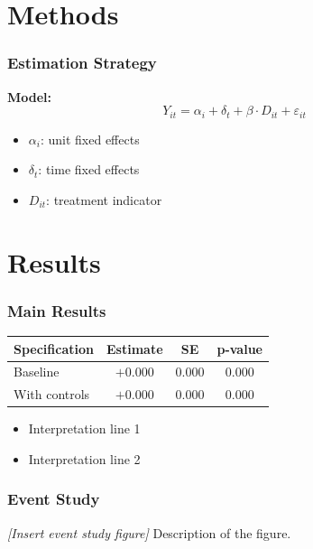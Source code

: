 \documentclass[xcolor = x11names, compress, aspectratio = 169]{beamer}
\renewcommand{\(}{\begin{columns}}
\renewcommand{\)}{\end{columns}}
\newcommand{\<}[1]{\begin{column}{#1}}
\renewcommand{\>}{\end{column}}
\begin{document}
\section{Methods}

    \begin{frame}
    \frametitle{Estimation Strategy}
        \small
        \textbf{Model:}
        \[
        Y_{it} = \alpha_i + \delta_t + \beta \cdot D_{it} + \varepsilon_{it}
        \]
        \begin{itemize}\setlength{\itemsep}{0.1cm}
            \item $\alpha_i$: unit fixed effects
            \item $\delta_t$: time fixed effects
            \item $D_{it}$: treatment indicator
        \end{itemize}
    \end{frame}

\section{Results}

    \begin{frame}
    \frametitle{Main Results}
        \centering
        \begin{tabular}{lccc}
            \toprule
            \textbf{Specification} & \textbf{Estimate} & \textbf{SE} & \textbf{p-value} \\
            \midrule
            Baseline & $+0.000$ & 0.000 & 0.000 \\
            With controls & $+0.000$ & 0.000 & 0.000 \\
            \bottomrule
        \end{tabular}

        \vspace{0.3cm}
        \begin{itemize}
            \item Interpretation line 1
            \item Interpretation line 2
        \end{itemize}
    \end{frame}

    \begin{frame}
    \frametitle{Event Study}
        \vfill
        \centering
        \textit{[Insert event study figure]}
        \vfill
        \small
        Description of the figure.
        \vspace{0.2cm}
    \end{frame}
\end{document}
